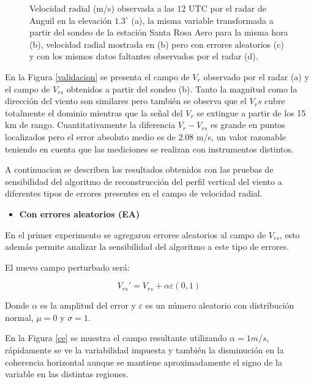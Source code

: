 \documentclass[12pt,spanish,oneside, a4paper]{book}
\providecommand{\tightlist}{%
  \setlength{\itemsep}{0pt}\setlength{\parskip}{0pt}}
\begin{document}
\begin{figure}
{}

\caption{Velocidad radial (m/s) observada a las 12 UTC por el radar de Anguil en la elevación $1.3^{\circ}$ (a), la misma variable transformada a partir del sondeo de la estación Santa Rosa Aero para la misma hora (b), velocidad radial mostrada en (b) pero con errores aleatorios (c) y con los mismos datos faltantes observados por el radar (d). \label{validacion}}\label{fig:validacion}
\end{figure}

En la Figura \ref{validacion} se presenta el campo de \(V_r\) observado
por el radar (a) y el campo de \(V_{rs}\) obtenidos a partir del sondeo
(b). Tanto la magnitud como la dirección del viento son similares pero
también se observa que el \(V_rs\) cubre totalmente el dominio mientras
que la señal del \(V_r\) se extingue a partir de los 15 km de rango.
Cuantitativamente la diferencia \(V_r - V_{rs}\) es grande en puntos
localizados pero el error absoluto medio es de 2.08 m/s, un valor
razonable teniendo en cuenta que las mediciones se realizan con
instrumentos distintos.

A continuacion se describen los resultados obtenidos con las pruebas de
sensibilidad del algoritmo de reconstrucción del perfil vertical del
viento a diferentes tipos de errores presentes en el campo de velocidad
radial.

\begin{itemize}
\tightlist
\item
  \textbf{Con errores aleatorios (EA)}
\end{itemize}

En el primer experimento se agregaron errores aleatorios al campo de
\(V_{rs}\), esto además permite analizar la sensibilidad del algoritmo a
este tipo de errores.

El nuevo campo perturbado será:

\begin{equation} \label{eq-vr12}
V_{rs}'  = V_{rs} + \alpha \varepsilon(0,1)
\end{equation}

Donde \(\alpha\) es la amplitud del error y \(\varepsilon\) es un número
aleatorio con distribución normal, \(\mu = 0\) y \(\sigma= 1\).

En la Figura \ref{ce} se muestra el campo resultante utilizando
\(\alpha = 1 m/s\), rápidamente se ve la variabilidad impuesta y también
la disminución en la coherencia horizontal aunque se mantiene
aproximadamente el signo de la variable en las distintas regiones.
\end{document}
